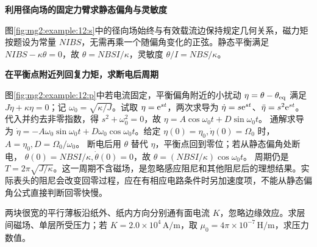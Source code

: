 \begin{solution}\textbf{利用径向场的固定力臂求静态偏角与灵敏度}\par\nobreak
图\ref{fig:mg2:example:12:s}中的径向场始终与有效载流边保持规定几何关系，磁力矩按题设为常量 $NIBS$，无需再乘一个随偏角变化的正弦。静态平衡满足 $NIBS-\kappa\theta=0$，故 $\theta=NBSI/\kappa$，灵敏度 $\theta/I=NBS/\kappa$。



\par\medskip{}\noindent\textbf{在平衡点附近列回复力矩，求断电后周期}\par\nobreak
图\ref{fig:mg2:example:12:p}中若电流固定，平衡偏角附近的小扰动 $\eta=\theta-\theta_{\rm eq}$ 满足 $J\ddot\eta+\kappa\eta=0$；记 $\omega_0=\sqrt{\kappa/J}$。试取 $\eta=\mathrm e^{st}$，两次求导为 $\dot\eta=s\mathrm e^{st}$、$\ddot\eta=s^2\mathrm e^{st}$。代入并约去非零指数，得
$s^2+\omega_0^2=0$，故
$\eta=A\cos\omega_0t+D\sin\omega_0t$。
通解求导为 $\dot\eta=-A\omega_0\sin\omega_0t+D\omega_0\cos\omega_0t$。给定 $\eta(0)=\eta_0,\dot\eta(0)=\Omega_0$ 时，
$A=\eta_0,D=\Omega_0/\omega_0$。
断电后用 $\theta$ 替代 $\eta$，平衡点回到零位；若从静态偏角处断电，
$\theta(0)=NBSI/\kappa,\dot\theta(0)=0$，故
$\theta=(NBSI/\kappa)\cos\omega_0t$。
周期仍是 $T=2\pi\sqrt{J/\kappa}$。这一周期不含磁场，是忽略感应阻尼和其他阻尼后的理想结果。实际表头的阻尼会改变回零过程，应在有相应电路条件时另加速度项，不能从静态偏角公式直接判断回零快慢。\end{solution}
\begin{question}\begin{example}[电流层的外场与磁压力]\label{mg2:example:13}
两块很宽的平行薄板沿纸外、纸内方向分别通有面电流 $K$，忽略边缘效应。求层间磁场、单层所受压力；若 $K=2.0\times10^4\,\mathrm{A/m}$，取 $\mu_0=4\pi\times10^{-7}\,\mathrm{H/m}$，求压力数值。
\end{example}
\end{question}
